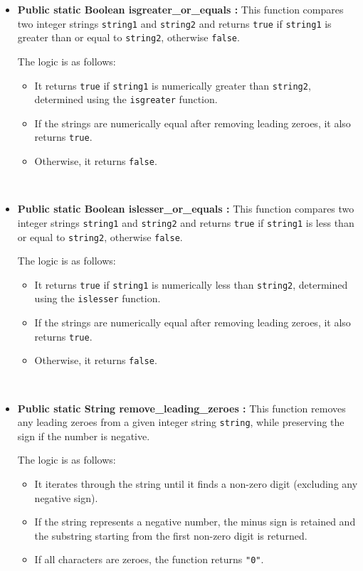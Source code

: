 \documentclass{article}
\begin{document}
\begin{itemize}
\item \textbf{Public static Boolean isgreater\_or\_equals :} This function compares two integer strings \texttt{string1} and \texttt{string2} and returns \texttt{true} if \texttt{string1} is greater than or equal to \texttt{string2}, otherwise \texttt{false}.

The logic is as follows:
\begin{itemize}
    \item It returns \texttt{true} if \texttt{string1} is numerically greater than \texttt{string2}, determined using the \texttt{isgreater} function.
    \item If the strings are numerically equal after removing leading zeroes, it also returns \texttt{true}.
    \item Otherwise, it returns \texttt{false}.
\end{itemize}\\

\item \textbf{Public static Boolean islesser\_or\_equals :} This function compares two integer strings \texttt{string1} and \texttt{string2} and returns \texttt{true} if \texttt{string1} is less than or equal to \texttt{string2}, otherwise \texttt{false}.

The logic is as follows:
\begin{itemize}
    \item It returns \texttt{true} if \texttt{string1} is numerically less than \texttt{string2}, determined using the \texttt{islesser} function.
    \item If the strings are numerically equal after removing leading zeroes, it also returns \texttt{true}.
    \item Otherwise, it returns \texttt{false}.
\end{itemize}\\

\item \textbf{Public static String remove\_leading\_zeroes :} This function removes any leading zeroes from a given integer string \texttt{string}, while preserving the sign if the number is negative.

The logic is as follows:
\begin{itemize}
    \item It iterates through the string until it finds a non-zero digit (excluding any negative sign).
    \item If the string represents a negative number, the minus sign is retained and the substring starting from the first non-zero digit is returned.
    \item If all characters are zeroes, the function returns \texttt{"0"}.
\end{itemize}\\


\end{itemize}
\end{document}
